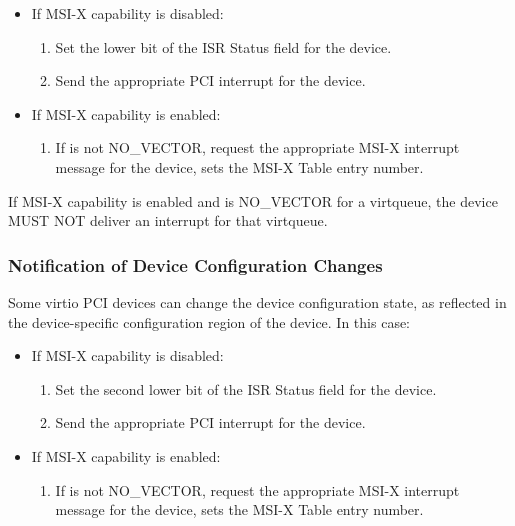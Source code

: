 \begin{itemize}
  \item If MSI-X capability is disabled:
    \begin{enumerate}
    \item Set the lower bit of the ISR Status field for the device.

    \item Send the appropriate PCI interrupt for the device.
    \end{enumerate}

  \item If MSI-X capability is enabled:
    \begin{enumerate}
    \item If  is not NO_VECTOR,
      request the appropriate MSI-X interrupt message for the
      device,  sets the MSI-X Table entry
      number.
    \end{enumerate}
\end{itemize}


If MSI-X capability is enabled and  is
NO_VECTOR for a virtqueue, the device MUST NOT deliver an interrupt
for that virtqueue.

\subsubsection{Notification of Device Configuration Changes}\label{sec:Virtio Transport Options / Virtio Over PCI Bus / PCI-specific Initialization And Device Operation / Notification of Device Configuration Changes}

Some virtio PCI devices can change the device configuration
state, as reflected in the device-specific configuration region of the device. In this case:

\begin{itemize}
  \item If MSI-X capability is disabled:
    \begin{enumerate}
    \item Set the second lower bit of the ISR Status field for the device.

    \item Send the appropriate PCI interrupt for the device.
    \end{enumerate}

  \item If MSI-X capability is enabled:
    \begin{enumerate}
    \item If  is not NO_VECTOR,
      request the appropriate MSI-X interrupt message for the
      device,  sets the MSI-X Table entry
      number.
    \end{enumerate}
\end{itemize}

